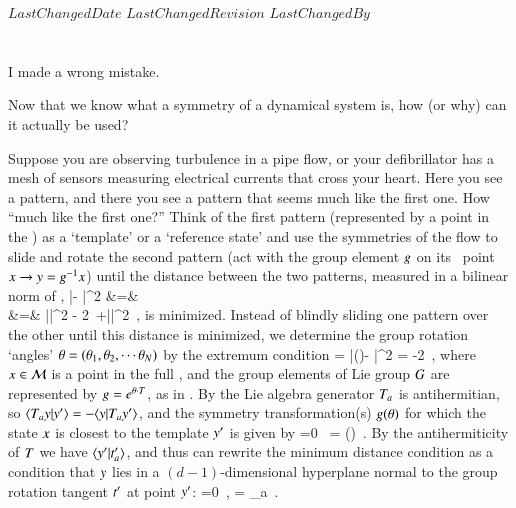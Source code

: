 
{$LastChangedDate$}
{$LastChangedRevision$} {$LastChangedBy$}


\section{\Reducedsp}
\label{sect:reducedStateSp}

\begin{bartlett}
I made a wrong mistake.
\end{bartlett}

\noindent
Now that we know what a symmetry of a dynamical system is, how
(or why) can it actually be used?

Suppose you are observing turbulence in a pipe flow, or your defibrillator has a mesh of sensors measuring electrical currents that cross your heart. Here you see a pattern, and there you see a pattern that seems much like the first one. How ``much like the first one?'' Think of the first pattern (represented by a point {\slicep} in the \statesp) as a 
`template' or a `reference state' and use the symmetries of the flow to slide and rotate the second pattern (act with the group element ${g}$ on its \statesp\ point $x \to y = {g}^{-1}x$) until the distance between the two patterns, measured in a bilinear norm of ,
\bea
|\sspRed - \slicep|^2
    &=& \braket{\sspRed - \slicep}{\sspRed - \slicep}
    \label{minDistance}\\
    &=& |\ssp|^2 - 2\,\braket{\sspRed}{\slicep} +|\slicep|^2
\,,
\nnu
\eea
is minimized. Instead of blindly sliding one pattern over the other until this distance is minimized, we determine the group rotation `angles' ${\bf \theta} = ({\bf \theta}_1,{\bf \theta}_2,\cdots{\bf \theta}_N)$ by the extremum condition
 = 
 |\LieEl(\gSpace)\ssp - \slicep|^2
 = -2 
\,,
where $x \in {\cal M}$ is a point in the full \statesp, and  the group elements of Lie group $G$ are represented  by $g=e^{{\bf \theta} \cdot T}$, as in .
By  the Lie algebra generator $T_a$ is antihermitian, so
$\braket{\Lg_a \sspRed}{\slicep}
= - \braket{\sspRed}{\Lg_a  \slicep}$,
and the symmetry transformation(s) $g({\bf \theta})$ for which
the state $x$ is closest to the template ${y'}$ is given
by
\beq
{} =0
    \,\qquad
\sspRed = \LieEl(\gSpace) \ssp
\,.
By the antihermiticity of $T$ we have
$\braket{\slicep}{\sliceTan{a}}$, and thus can rewrite the minimum
distance condition
 as a condition that $y$ lies in
a $(d\!-\!1)$-dimensional hyperplane
normal to the group rotation tangent $t'_{}$ at point
${y'}$:
\beq
{}=0
    \,,\qquad
{} = \Lg_a \slicep
\,.

